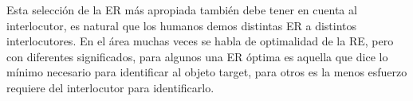 Esta selecci\'on de la ER m\'as apropiada tambi\'en debe tener en cuenta al interlocutor, es natural que los humanos demos distintas ER a distintos interlocutores. En el \'area muchas veces se habla de optimalidad de la RE, pero con diferentes significados, para algunos una ER \'optima es aquella que dice lo m\'inimo necesario para identificar al objeto target, para otros es la menos esfuerzo requiere del interlocutor para identificarlo.\\

